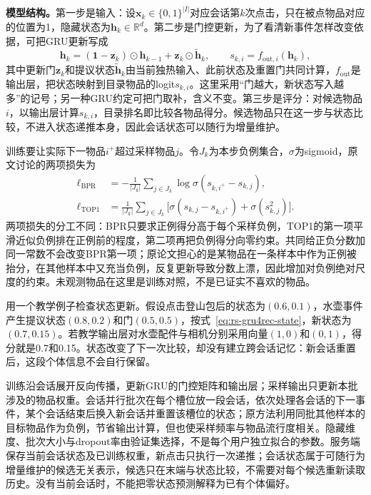 \textbf{模型结构。}第一步是输入：设$\bm{x}_k\in\{0,1\}^{|I|}$对应会话第$k$次点击，只在被点物品对应的位置为1，隐藏状态为$\bm{h}_k\in\mathbb{R}^d$。第二步是门控更新，为了看清新事件怎样改变依据，可把GRU更新写成
\begin{equation}
  \bm{h}_k=(\bm{1}-\bm{z}_k)\odot\bm{h}_{k-1}
       +\bm{z}_k\odot\widetilde{\bm{h}}_k,\qquad
  s_{k,i}=f_{\mathrm{out},i}(\bm{h}_k),
  \label{eq:rs-gru4rec-state}
\end{equation}
其中更新门$\bm{z}_k$和提议状态$\widetilde{\bm{h}}_k$由当前独热输入、此前状态及重置门共同计算，$f_{\mathrm{out}}$是输出层，把状态映射到目录物品的logit$s_{k,i}$。这里采用“门越大，新状态写入越多”的记号；另一种GRU约定可把门取补，含义不变。第三步是评分：对候选物品$i$，以输出层计算$s_{k,i}$，目录排名即比较各物品得分。候选物品只在这一步与状态比较，不进入状态递推本身，因此会话状态可以随行为增量维护。

训练要让实际下一物品$i^+$超过采样物品$j$。令$J_k$为本步负例集合，$\sigma$为sigmoid，原文讨论的两项损失为
\begin{align}
  \ell_{\mathrm{BPR}}
    &=-\frac{1}{|J_k|}\sum_{j\in J_k}\log\sigma(s_{k,i^+}-s_{k,j}),\\
  \ell_{\mathrm{TOP1}}
    &=\frac{1}{|J_k|}\sum_{j\in J_k}
       \bigl[\sigma(s_{k,j}-s_{k,i^+})+\sigma(s_{k,j}^2)\bigr].
  \label{eq:rs-gru4rec-top1}
\end{align}
两项损失的分工不同：BPR只要求正例得分高于每个采样负例，TOP1的第一项平滑近似负例排在正例前的程度，第二项再把负例得分向零约束。共同给正负分数加同一常数不会改变BPR第一项；原论文担心的是某物品在一条样本中作为正例被抬分，在其他样本中又充当负例，反复更新导致分数上漂，因此增加对负例绝对尺度的约束。未观测物品在这里是训练对照，不是已证实不喜欢的物品。

用一个教学例子检查状态更新。假设点击登山包后的状态为$(0.6,0.1)$，水壶事件产生提议状态$(0.8,0.2)$和门$(0.5,0.5)$，按式~\eqref{eq:rs-gru4rec-state}，新状态为$(0.7,0.15)$。若教学输出层对水壶配件与相机分别采用向量$(1,0)$和$(0,1)$，得分就是0.7和0.15。状态改变了下一次比较，却没有建立跨会话记忆：新会话重置后，这段个体信息不会自行保留。

训练沿会话展开反向传播，更新GRU的门控矩阵和输出层；采样输出只更新本批涉及的物品权重。会话并行批次在每个槽位放一段会话，依次处理各会话的下一事件，某个会话结束后换入新会话并重置该槽位的状态；原方法利用同批其他样本的目标物品作为负例，节省输出计算，但也使采样频率与物品流行度相关。隐藏维度、批次大小与dropout率由验证集选择，不是每个用户独立拟合的参数。服务端保存当前会话状态及已训练权重，新点击只执行一次递推；会话状态属于可随行为增量维护的候选无关表示，候选只在末端与状态比较，不需要对每个候选重新读取历史。没有当前会话时，不能把零状态预测解释为已有个体偏好。

